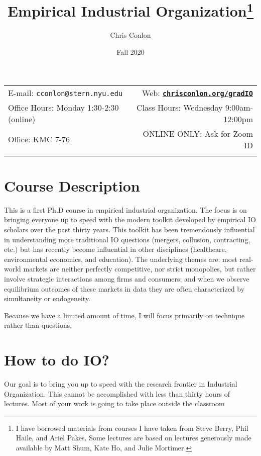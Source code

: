 \documentclass[11pt]{article}
\title{Empirical Industrial Organization\footnote{I have borrowed materials from courses I have taken from Steve Berry, Phil Haile, and Ariel Pakes. Some lectures are based on lectures generously made available by Matt Shum, Kate Ho, and Julie Mortimer.}}
\author{Chris Conlon}
\date{Fall 2020}
\newcommand{\blankline}{\quad\pagebreak[2]}
\begin{document}
\maketitle

\blankline

\begin{tabular*}{.93\textwidth}{@{\extracolsep{\fill}}lr}


  E-mail: \texttt{cconlon@stern.nyu.edu} & Web: \href{http://chrisconlon.org}{\tt\bf chrisconlon.org/gradIO}  \\

 Office Hours: Monday 1:30-2:30 (online) &  Class Hours: Wednesday 9:00am-12:00pm \\


 Office: KMC 7-76  & ONLINE ONLY: Ask for Zoom ID \\
&  \\
\hline
\end{tabular*}

\vspace{10 mm}

\section*{Course Description}
This is a first Ph.D course in empirical industrial organization. The focus is on bringing everyone up to speed with the modern toolkit developed by empirical IO scholars over the past thirty years. This toolkit has been tremendously influential in understanding more traditional IO questions (mergers, collusion, contracting, etc.) but has recently become influential in other disciplines (healthcare, environmental economics, and education). The underlying themes are: most real-world markets are neither perfectly competitive, nor strict monopolies, but rather involve strategic interactions among firms and consumers; and when we observe equilibrium outcomes of these markets in data they are often characterized by simultaneity or endogeneity.

Because we have a limited amount of time, I will focus primarily on technique rather than questions.

\section*{How to do IO?}
Our goal is to bring you up to speed with the research frontier in Industrial Organization. This cannot be accomplished with less than thirty hours of lectures. Most of your work is going to take place outside the classroom
\end{document}
